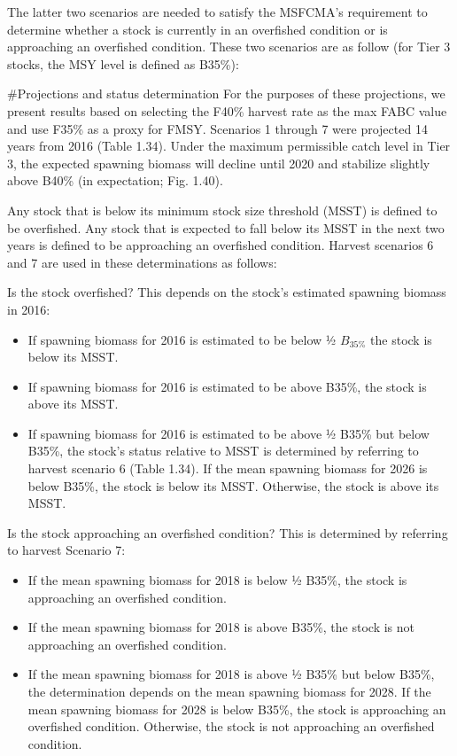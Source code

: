 The latter two scenarios are needed to satisfy the MSFCMA's requirement
to determine whether a stock is currently in an overfished condition or
is approaching an overfished condition. These two scenarios are as
follow (for Tier 3 stocks, the MSY level is defined as B35\%):

\#Projections and status determination For the purposes of these
projections, we present results based on selecting the F40\% harvest
rate as the max FABC value and use F35\% as a proxy for FMSY. Scenarios
1 through 7 were projected 14 years from 2016 (Table 1.34). Under the
maximum permissible catch level in Tier 3, the expected spawning biomass
will decline until 2020 and stabilize slightly above B40\% (in
expectation; Fig. 1.40).

Any stock that is below its minimum stock size threshold (MSST) is
defined to be overfished. Any stock that is expected to fall below its
MSST in the next two years is defined to be approaching an overfished
condition. Harvest scenarios 6 and 7 are used in these determinations as
follows:

Is the stock overfished? This depends on the stock's estimated spawning
biomass in 2016:

\begin{itemize}
\tightlist
\item
  If spawning biomass for 2016 is estimated to be below ½ \(B_{35\%}\)
  the stock is below its MSST.\\
\item
  If spawning biomass for 2016 is estimated to be above B35\%, the stock
  is above its MSST.\\
\item
  If spawning biomass for 2016 is estimated to be above ½ B35\% but
  below B35\%, the stock's status relative to MSST is determined by
  referring to harvest scenario 6 (Table 1.34). If the mean spawning
  biomass for 2026 is below B35\%, the stock is below its MSST.
  Otherwise, the stock is above its MSST.
\end{itemize}

Is the stock approaching an overfished condition? This is determined by
referring to harvest Scenario 7:

\begin{itemize}
\tightlist
\item
  If the mean spawning biomass for 2018 is below ½ B35\%, the stock is
  approaching an overfished condition.\\
\item
  If the mean spawning biomass for 2018 is above B35\%, the stock is not
  approaching an overfished condition.\\
\item
  If the mean spawning biomass for 2018 is above ½ B35\% but below
  B35\%, the determination depends on the mean spawning biomass for
  2028. If the mean spawning biomass for 2028 is below B35\%, the stock
  is approaching an overfished condition. Otherwise, the stock is not
  approaching an overfished condition.
\end{itemize}

